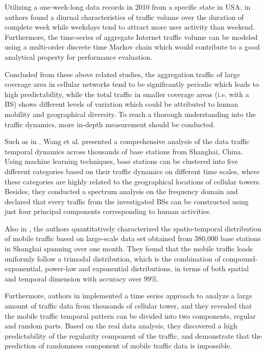 Utilizing a one-week-long data records in 2010 from a specific state in USA, in \cite{shafiq2011characterizing} authors found a diurnal characteristics of traffic volume over the duration of complete week while weekdays tend to attract more user activity than weekend. Furthermore, the time-series of aggregate Internet traffic volume can be modeled using a multi-order discrete time Markov chain which would contribute to a good analytical property for performance evaluation.

Concluded from these above related studies, the aggregation traffic of large coverage area in cellular networks tend to be significantly periodic which leads to high predictability, while the total traffic in smaller coverage areas (i.e. with a BS) shows different levels of variation which could be attributed to human mobility and geographical diversity. To reach a thorough understanding into the traffic dynamics, more in-depth measurement should be conducted.

Such as in \cite{wang2015understanding}, Wang et al. presented a comprehensive analysis of the data traffic temporal dynamics across thousands of base stations from Shanghai, China. Using machine learning techniques, base stations can be clustered into five different categories based on their traffic dynamics on different time scales, where these categories are highly related to the geographical locations of cellular towers. Besides, they conducted a spectrum analysis on the frequency domain and declared that every traffic from the investigated BSs can be constructed using just four principal components corresponding to human activities.

Also in \cite{wang2015characterizing}, the authors quantitatively characterized the spatio-temporal distribution of mobile traffic based on large-scale data set obtained from 380,000 base stations in Shanghai spanning over one month. They found that the mobile traffic loads uniformly follow a trimodal distribution, which is the combination of compound-exponential, power-law and exponential distributions, in terms of both spatial and temporal dimension with accuracy over 99\%.

Furthermore, authors in \cite{xu2016big} implemented a time series approach to analyze a large amount of traffic data from thousands of cellular tower, and they revealed that the mobile traffic temporal pattern can be divided into two components, regular and random parts. Based on the real data analysis, they discovered a high predictability of the regularity component of the traffic, and demonstrate that the prediction of randomness component of mobile traffic data is impossible.

